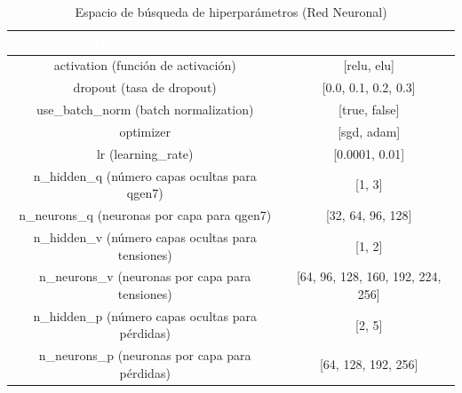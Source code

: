 \begin{table}[htp]
	\centering
	\renewcommand{\arraystretch}{1.3}
		\begin{tabular}{ | c | c | }
			\hline
			\rowcolor[HTML]{5B9BD5} 
			\textcolor{white}{\textbf{Hiperparámetro}} & \textcolor{white}{\textbf{Espacio de búsqueda}}\\
			\hline
			
			activation (función de activación) & [relu, elu] \\
			\hline
			dropout (tasa de dropout)& [0.0, 0.1, 0.2, 0.3] \\
			\hline
			use\_batch\_norm (batch normalization) & [true, false] \\
			\hline
			optimizer & [sgd, adam] \\
			\hline
			lr (learning\_rate) & [0.0001, 0.01] \\
			\hline
			n\_hidden\_q (número capas ocultas para qgen7) & [1, 3] \\
			\hline
			n\_neurons\_q (neuronas por capa para qgen7) & [32, 64, 96, 128] \\
			\hline
			n\_hidden\_v (número capas ocultas para tensiones) & [1, 2] \\
			\hline
			n\_neurons\_v (neuronas por capa para tensiones) & [64, 96, 128, 160, 192, 224, 256] \\
			\hline
			n\_hidden\_p (número capas ocultas para pérdidas) & [2, 5] \\
			\hline
			n\_neurons\_p (neuronas por capa para pérdidas) & [64, 128, 192, 256] \\
			\hline
			
		\end{tabular} 
		
		\caption{Espacio de búsqueda de hiperparámetros (Red Neuronal)}
		\label{table:nn_hiperparam}
	\end{table}